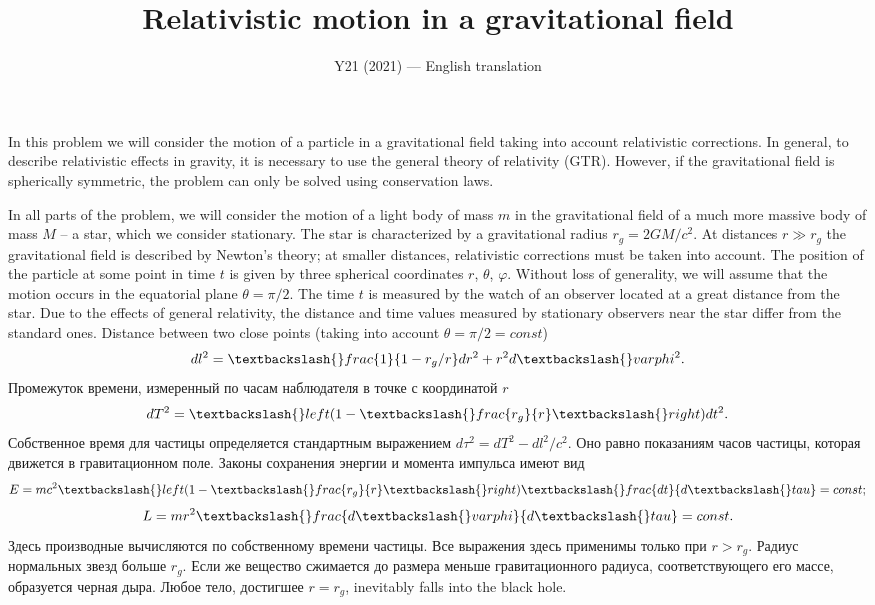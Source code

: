 \documentclass[11pt,a4paper]{article}
\title{\textbf{Relativistic motion in a gravitational field}}
\author{\normalsize Y21 (2021) --- English translation}
\date{}
\begin{document}
\maketitle

In this problem we will consider the motion of a particle in a gravitational field taking into account relativistic corrections. In general, to describe relativistic effects in gravity, it is necessary to use the general theory of relativity (GTR).  However, if the gravitational field is spherically symmetric, the problem can only be solved using conservation laws.

In all parts of the problem, we will consider the motion of a light body of mass $m$ in the gravitational field of a much more massive body of mass $M$ – a star, which we consider stationary. The star is characterized by a gravitational radius $r_g = 2GM/c^2$. At distances $r \gg r_g$ the gravitational field is described by Newton’s theory; at smaller distances, relativistic corrections must be taken into account. The position of the particle at some point in time $t$ is given by three spherical coordinates $r$, $\theta$, $\varphi$.  Without loss of generality, we will assume that the motion occurs in the equatorial plane $\theta = \pi/2$. The time $t$ is measured by the watch of an observer located at a great distance from the star. Due to the effects of general relativity, the distance and time values ​​measured by stationary observers near the star differ from the standard ones. Distance between two close points (taking into account $\theta = \pi/2 = const$) $$ dl^2 = \textbackslash\{\}frac\{1\}\{1-r_g/r\} dr^2 + r^2  d\textbackslash\{\}varphi^2. $$ Промежуток времени, измеренный по часам наблюдателя в точке с координатой $r$ $$ dT^2 = \textbackslash\{\}left(1- \textbackslash\{\}frac\{r_g\}\{r\}\textbackslash\{\}right) dt^2. $$ Собственное время для частицы определяется стандартным выражением $d\tau^2 = dT^2 - dl^2/c^2$. Оно равно показаниям часов частицы, которая движется в гравитационном поле. Законы  сохранения энергии и момента импульса имеют вид $$ E = mc^2 \textbackslash\{\}left(1- \textbackslash\{\}frac\{r_g\}\{r\}\textbackslash\{\}right) \textbackslash\{\}frac\{dt\}\{d\textbackslash\{\}tau\} = const; $$ $$ L = m r^2 \textbackslash\{\}frac\{d\textbackslash\{\}varphi\}\{d\textbackslash\{\}tau\} = const. $$ Здесь производные вычисляются по собственному времени частицы. Все выражения здесь применимы только при $r>r_g$. Радиус нормальных звезд больше $r_g$. Если же вещество сжимается до размера меньше гравитационного радиуса, соответствующего его массе, образуется черная дыра. Любое тело, достигшее $r= r_g$, inevitably falls into the black hole.
\end{document}
